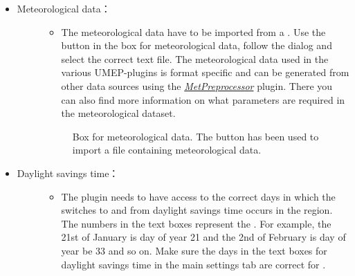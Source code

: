 \documentclass[letterpaper,10pt,english]{sphinxmanual}
\begin{document}
\begin{itemize}
\begin{description}
\begin{itemize}
\begin{description}
\begin{itemize}
\item {} \begin{description}
\item[{Meteorological data：}] \leavevmode\begin{itemize}
\item {} 
The meteorological data have to be imported from a . Use the button in the box for meteorological data, follow the dialog and select the correct text file. The meteorological data used in the various UMEP-plugins is format specific and can be generated from other data sources using the {\hyperref[\detokenize{pre-processor/SUEWS Prepare:Meteorological_Data:_MetPreprocessor}]{\emph{MetPreprocessor}}} plugin. There you can also find more information on what parameters are required in the meteorological dataset.

\end{itemize}

\begin{figure}[htbp]
\centering
\capstart

\noindent{}
\caption{Box for meteorological data. The button has been used to import a file containing meteorological data.}\label{\detokenize{pre-processor/SUEWS Prepare:id6}}\end{figure}

\end{description}

\item {} \begin{description}
\item[{Daylight savings time：}] \leavevmode\begin{itemize}
\item {} 
The plugin needs to have access to the correct days in which the switches to and from daylight savings time occurs in the region. The numbers in the text boxes represent the . For example, the 21st of January is day of year 21 and the 2nd of February is day of year be 33 and so on. Make sure the days in the text boxes for daylight savings time in the main settings tab are correct for .

\end{itemize}

\begin{figure}[htbp]
\centering
\capstart


\end{figure}
\end{description}
\end{itemize}
\end{description}
\end{itemize}
\end{description}
\end{itemize}
\end{document}
